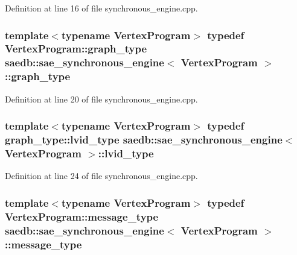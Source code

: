 Definition at line 16 of file synchronous\-\_\-engine.\-cpp.

\hypertarget{classsaedb_1_1sae__synchronous__engine_a1eb5ce9b2d9118a21a615211fb026a0e}{
\subsubsection[{graph\-\_\-type}]{\setlength{\rightskip}{0pt plus 5cm}template$<$typename Vertex\-Program$>$ typedef Vertex\-Program\-::graph\-\_\-type {\bf saedb\-::sae\-\_\-synchronous\-\_\-engine}$<$ Vertex\-Program $>$\-::{\bf graph\-\_\-type}}}\label{d7/d39/classsaedb_1_1sae__synchronous__engine_a1eb5ce9b2d9118a21a615211fb026a0e}


Definition at line 20 of file synchronous\-\_\-engine.\-cpp.

\hypertarget{classsaedb_1_1sae__synchronous__engine_a620457f95f0672c538683e94bf97fa2b}{
\subsubsection[{lvid\-\_\-type}]{\setlength{\rightskip}{0pt plus 5cm}template$<$typename Vertex\-Program$>$ typedef {\bf graph\-\_\-type\-::lvid\-\_\-type} {\bf saedb\-::sae\-\_\-synchronous\-\_\-engine}$<$ Vertex\-Program $>$\-::{\bf lvid\-\_\-type}}}\label{d7/d39/classsaedb_1_1sae__synchronous__engine_a620457f95f0672c538683e94bf97fa2b}


Definition at line 24 of file synchronous\-\_\-engine.\-cpp.

\hypertarget{classsaedb_1_1sae__synchronous__engine_ac357ebb2c5a1d064c39189cf66ea3115}{
\subsubsection[{message\-\_\-type}]{\setlength{\rightskip}{0pt plus 5cm}template$<$typename Vertex\-Program$>$ typedef Vertex\-Program\-::message\-\_\-type {\bf saedb\-::sae\-\_\-synchronous\-\_\-engine}$<$ Vertex\-Program $>$\-::{\bf message\-\_\-type}}}\label{d7/d39/classsaedb_1_1sae__synchronous__engine_ac357ebb2c5a1d064c39189cf66ea3115}


